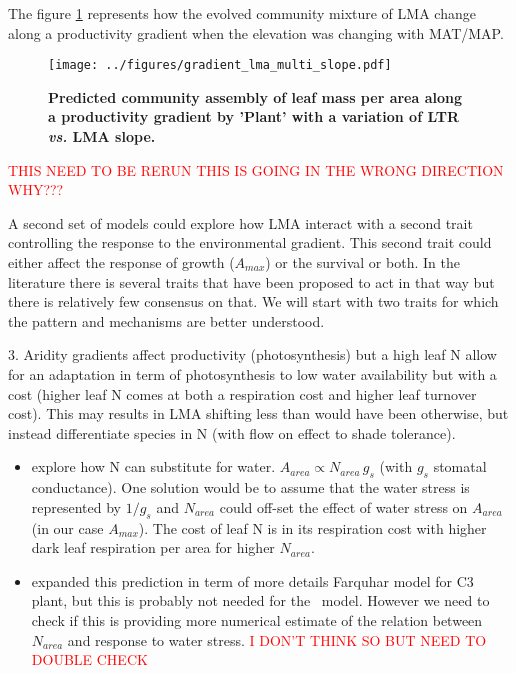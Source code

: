 \documentclass[a4paper,11pt]{article}
\begin{document}
The figure \ref{fig:lma_mat_o_map} represents how the evolved community mixture of LMA change along a productivity gradient when the elevation was changing with MAT/MAP.

\begin{figure}[ht]
\centering
\texttt{[image: ../figures/gradient\_lma\_multi\_slope.pdf]}
\caption{\textbf{Predicted community assembly of leaf mass per area along a productivity gradient by 'Plant' with a variation of LTR \textit{vs.} LMA slope.}
\label{fig:lma_mat_o_map}}
\end{figure}

\textcolor{red}{THIS NEED TO BE RERUN THIS IS GOING IN THE WRONG DIRECTION WHY???}

\clearpage

A second set of models could explore how LMA interact with a second trait controlling the response to the environmental gradient. This second trait could either affect the response of growth ($A_{max}$) or the survival or both. In the literature there is several traits that have been proposed to act in that way but there is relatively few consensus on that. We will start with two traits for which the pattern and mechanisms are better understood.

3. Aridity gradients affect productivity (photosynthesis) but a
high leaf N allow for an adaptation in term of photosynthesis to low water availability but with a cost (higher leaf N comes at both a respiration cost and higher leaf turnover cost). This may results in LMA shifting less than would have been otherwise, but  instead differentiate species in N (with flow on effect to shade tolerance).


\begin{itemize}
\item \citet{Wright-2003} explore how N can substitute for water. $A_{area} \propto N_{area} \, g_s$ (with $g_s$ stomatal conductance). One solution would be to assume that the water stress is represented by $1/g_s$ and $N_{area}$ could off-set the effect of water stress on $A_{area}$ (in our case $A_{max}$). The cost of leaf N is in its respiration cost with higher dark leaf respiration per area for higher $N_{area}$.

\item \citet{Prentice-2014} expanded this prediction in term of more details Farquhar model for C3 plant, but this is probably not needed for the \plant\ model. However we need to check if this is providing more numerical estimate of the relation between $N_{area}$ and response to water stress. \textcolor{red}{I DON'T THINK SO BUT NEED TO DOUBLE CHECK}
\end{itemize}
\end{document}
